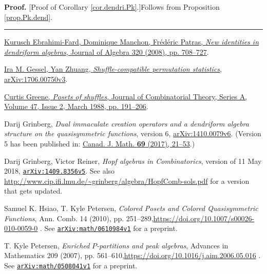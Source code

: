\documentclass[numbers=enddot,12pt,final,onecolumn,notitlepage]{scrartcl}%
\theoremstyle{definition}
\newenvironment{proof}[1][Proof]{\noindent\textbf{#1.} }{\ \rule{0.5em}{0.5em}}
\begin{document}
\begin{proof}
[Proof of Corollary \ref{cor.dendri.Pk}.]Follows from Proposition
\ref{prop.Pk.dend}.
\end{proof}

\begin{thebibliography}{99999999}                                                                                         %


%
\href{https://doi.org/10.1016/j.jalgebra.2007.12.013}{Kurusch Ebrahimi-Fard,
Dominique Manchon, Fr\'{e}d\'{e}ric Patras, \textit{New identities in
dendriform algebras}, Journal of Algebra 320 (2008), pp. 708--727}.

\href{http://arxiv.org/abs/1706.00750v3}{Ira M.
Gessel, Yan Zhuang, \textit{Shuffle-compatible permutation statistics},
arXiv:1706.00750v3}.

%
\href{https://doi.org/10.1016/0097-3165(88)90018-0}{Curtis Greene,
\textit{Posets of shuffles}, Journal of Combinatorial Theory, Series A, Volume
47, Issue 2, March 1988, pp. 191--206}.

Darij Grinberg, \textit{Dual immaculate creation
operators and a dendriform algebra structure on the quasisymmetric functions},
version 6, \href{https://arxiv.org/abs/1410.0079v6}{arXiv:1410.0079v6}.
(Version 5 has been published in:
\href{https://cms.math.ca/10.4153/CJM-2016-018-8?abfmt=ltx}{Canad. J. Math.
\textbf{69} (2017), 21--53}.)

Darij Grinberg, Victor Reiner, \textit{Hopf
algebras in Combinatorics}, version of 11 May 2018,
\href{http://www.arxiv.org/abs/1409.8356v5}{\texttt{arXiv:1409.8356v5}}.
\newline See also
\url{http://www.cip.ifi.lmu.de/~grinberg/algebra/HopfComb-sols.pdf} for a
version that gets updated.

Samuel K. Hsiao, T. Kyle Petersen, \textit{Colored
Posets and Colored Quasisymmetric Functions}, Ann. Comb. 14 (2010), pp.
251--289,\newline\url{https://doi.org/10.1007/s00026-010-0059-0} . See
\href{http://www.arxiv.org/abs/math/0610984v1}{\texttt{arXiv:math/0610984v1}}
for a preprint.

T. Kyle Petersen, \textit{Enriched }$\mathit{P}%
$\textit{-partitions and peak algebras}, Advances in Mathematics 209 (2007),
pp. 561--610,\newline\url{https://doi.org/10.1016/j.aim.2006.05.016} . See
\texttt{\href{https://arxiv.org/abs/math/0508041v1}{arXiv:math/0508041v1}} for
a preprint.


\end{thebibliography}
\end{document}
